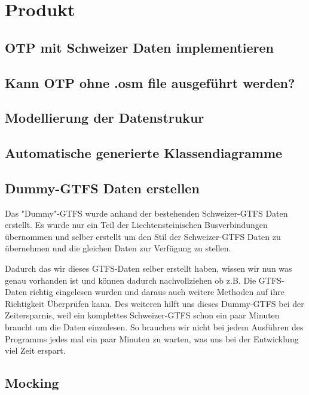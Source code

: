 \section{Produkt}

\subsection{OTP mit Schweizer Daten implementieren}

\subsection{Kann OTP ohne .osm file ausgeführt werden?}

\subsection{Modellierung der Datenstrukur}

\subsection{Automatische generierte Klassendiagramme}

\subsection{Dummy-GTFS Daten erstellen}
Das "Dummy"-GTFS wurde anhand der bestehenden Schweizer-GTFS Daten erstellt. Es wurde nur ein Teil der Liechtensteinischen Busverbindungen übernommen und selber erstellt um den Stil der Schweizer-GTFS Daten zu übernehmen und die gleichen Daten zur Verfügung zu stellen.

Dadurch das wir dieses GTFS-Daten selber erstellt haben, wissen wir nun was genau vorhanden ist und können dadurch nachvollziehen ob z.B. Die GTFS-Daten richtig eingelesen wurden und daraus auch weitere Methoden auf ihre Richtigkeit Überprüfen kann. Des weiteren hilft uns dieses Dummy-GTFS bei der Zeitersparnis, weil ein komplettes Schweizer-GTFS schon ein paar Minuten braucht um die Daten einzulesen. So brauchen wir nicht bei jedem Ausführen des Programms jedes mal ein paar Minuten zu warten, was uns bei der Entwicklung viel Zeit erspart. 

\subsection{Mocking}

